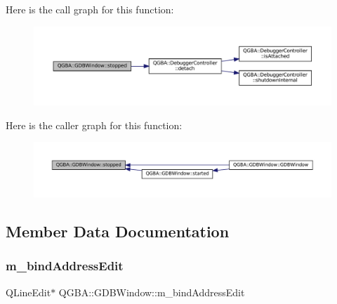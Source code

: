 Here is the call graph for this function\+:
\nopagebreak
\begin{figure}[H]
\begin{center}
\leavevmode
\includegraphics[width=350pt]{class_q_g_b_a_1_1_g_d_b_window_a7bd93507046abbd87f237a6065a3cd21_cgraph}
\end{center}
\end{figure}
Here is the caller graph for this function\+:
\nopagebreak
\begin{figure}[H]
\begin{center}
\leavevmode
\includegraphics[width=350pt]{class_q_g_b_a_1_1_g_d_b_window_a7bd93507046abbd87f237a6065a3cd21_icgraph}
\end{center}
\end{figure}


\subsection{Member Data Documentation}
\mbox{\label{class_q_g_b_a_1_1_g_d_b_window_aa11f864f94d87111679b21ffd9b40181}} 
\subsubsection{\texorpdfstring{m\+\_\+bind\+Address\+Edit}{m\_bindAddressEdit}}
{\footnotesize\ttfamily Q\+Line\+Edit$\ast$ Q\+G\+B\+A\+::\+G\+D\+B\+Window\+::m\+\_\+bind\+Address\+Edit\hspace{0.3cm}{\ttfamily [private]}}

\mbox{\label{class_q_g_b_a_1_1_g_d_b_window_aabe5ebd4593b29ee805d6bed9cb64dc1}} 
